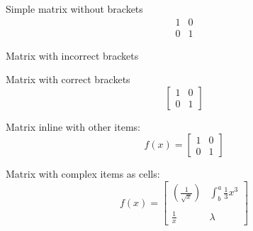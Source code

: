 \documentclass{article}
\begin{document}
Simple matrix without brackets
\begin{equation*}
\begin{matrix}
1 & 0\\
0 & 1
\end{matrix}
\end{equation*}

Matrix with incorrect brackets
\begin{equation*}
[
\begin{matrix}
1 & 0\\
0 & 1
\end{matrix}
]
\end{equation*}

Matrix with correct brackets
\begin{equation*}
\left[
\begin{matrix}
1 & 0\\
0 & 1
\end{matrix}
\right]
\end{equation*}

Matrix inline with other items:
\begin{equation*}
f(x) =
\left[
\begin{matrix}
1 & 0\\
0 & 1
\end{matrix}
\right]
\end{equation*}

Matrix with complex items as cells:
\begin{equation*}
f(x) =
\left[
\begin{matrix}
\left(\frac{1}{\sqrt{x}}\right) & \int^a_b \frac{1}{3}x^3\\\\
\frac{1}{x} & \lambda
\end{matrix}
\right]
\end{equation*}
\end{document}
